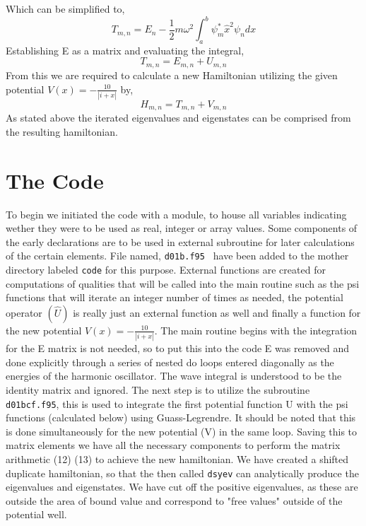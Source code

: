 \documentclass[12pt,letterpaper,notitlepage]{article}
\begin{document}
Which can be simplified to, 
	\begin{equation}
		T_{m,n} = E_n - \frac{1}{2}m\omega^2\int_{a}^{b} \psi_{m}^{*} \hat{x}^2 \psi_n dx
	\end{equation} 
Establishing E as a matrix and evaluating the integral, 
	\begin{equation}
		T_{m,n}=E_{m,n}+U_{m,n}
	\end{equation} 
From this we are required to calculate a new Hamiltonian utilizing the given potential $V(x)=-\frac{10}{|i+x|}$ by, 
	\begin{equation}
		H_{m,n}=T_{m,n}+V_{m,n}
	\end{equation} 
As stated above the iterated eigenvalues and eigenstates can be comprised from the resulting hamiltonian. 


\section{The Code}

To begin we initiated the code with a module, to house all variables indicating wether they were to be used as real, integer or array values. Some components of the early declarations are to be used in external subroutine for later calculations of the certain elements. File named, {\tt d01b.f95 } have been added to the mother directory labeled {\tt code} for this purpose. 
External functions are created for computations of qualities that will be called into the main routine such as the psi functions that will iterate an integer number of times as needed, the potential operator $(\hat{U})$ is really just an external function as well and finally a function for the new potential $V(x)=-\frac{10}{|i+x|}$.   
The main routine begins with the integration for the E matrix is not needed, so to put this into the code E was removed and done explicitly through a series of nested do loops entered diagonally as the energies of the harmonic oscillator. The wave integral is understood to be the identity matrix and ignored. The next step is to utilize the subroutine {\tt d01bcf.f95}, this is used to integrate the first potential function U with the psi functions (calculated below) using Guass-Legrendre. It should be noted that this is done simultaneously for the new potential (V) in the same loop. Saving this to matrix elements we have all the necessary components to perform the matrix arithmetic (12) (13) to achieve the new hamiltonian. We have created a shifted duplicate hamiltonian, so that the then called {\tt dsyev} can analytically produce the eigenvalues and eigenstates. We have cut off the positive eigenvalues, as these are outside the area of bound value and correspond to "free values" outside of the potential well.  
             
\end{document}
